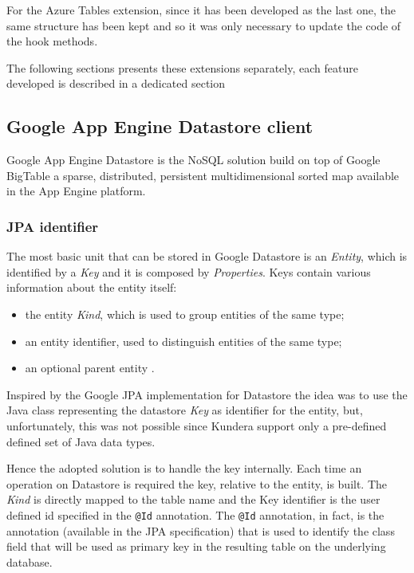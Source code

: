 \noindent For the Azure Tables extension, since it has been developed as the last one, the same structure has been kept and so it was only necessary to update the code of the hook methods.

\noindent The following sections presents these extensions separately, each feature developed is described in a dedicated section

\subsection{Google App Engine Datastore client}
\label{sec:kundera-datastore}
Google App Engine Datastore \cite{online:datastore} is the NoSQL solution build on top of Google BigTable a sparse, distributed, persistent multidimensional sorted map available in the App Engine platform. 

\subsubsection{JPA identifier}
The most basic unit that can be stored in Google Datastore is an \textit{Entity}, which is identified by a \textit{Key} and it is composed by \textit{Properties}.
Keys contain various information about the entity itself:
\begin{itemize}
\item the entity \textit{Kind}, which is used to group entities of the same type;
\item an entity identifier, used to distinguish entities of the same type;
\item an optional parent entity .
\end{itemize}
Inspired by the Google JPA implementation for Datastore \cite{online:googlejpa} the idea was to use the Java class representing the datastore \textit{Key} as identifier for the entity, but, unfortunately, this was not possible since Kundera support only a pre-defined defined set of Java data types.

\noindent Hence the adopted solution is to handle the key internally. Each time an operation on Datastore is required the key, relative to the entity, is built. The \textit{Kind} is directly mapped to the table name and the Key identifier is the user defined id specified in the \texttt{@Id} annotation.
The \texttt{@Id} annotation, in fact, is the annotation (available in the JPA specification) that is used to identify the class field that will be used as primary key in the resulting table on the underlying database.

